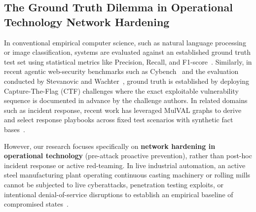 \documentclass[target=mst,aauheader=aics,style=]{thud}
\begin{document}
\subsection{The Ground Truth Dilemma in Operational Technology Network Hardening}
In conventional empirical computer science, such as natural language processing or image classification, systems are evaluated against an established ground truth test set using statistical metrics like Precision, Recall, and F1-score~\cite{WachterSurvey}. Similarly, in recent agentic web-security benchmarks such as Cybench~\cite{cybench2024} and the evaluation conducted by Stevanovic and Wachter~\cite{StevanovicWachterRAISE}, ground truth is established by deploying Capture-The-Flag (CTF) challenges where the exact exploitable vulnerability sequence is documented in advance by the challenge authors. In related domains such as incident response, recent work has leveraged MulVAL graphs to derive and select response playbooks across fixed test scenarios with synthetic fact bases~\cite{gurabi2026playbooks}. 

However, our research focuses specifically on \textbf{network hardening in operational technology} (pre-attack proactive prevention), rather than post-hoc incident response or active red-teaming. In live industrial automation, an active steel manufacturing plant operating continuous casting machinery or rolling mills cannot be subjected to live cyberattacks, penetration testing exploits, or intentional denial-of-service disruptions to establish an empirical baseline of compromised states~\cite{SunderOT, TayouriSurvey}. 
\end{document}
